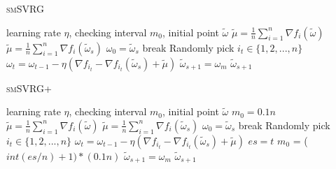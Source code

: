 \documentclass[conference]{IEEEtran}
\begin{document}
 
 \begin{algorithm}[t]
 	\caption{\textsc{smSVRG}}
	\label{smSVRG}
	\begin{algorithmic}[1]
	\Require learning rate $\eta$, checking interval $m_0$, initial point $\tilde{\omega}$
	\State $\tilde{\mu} = \frac{1}{n}\sum\limits_{i=1}^{n}\nabla f_{i}(\tilde{\omega})$
		\State $\tilde{\mu} = \frac{1}{n}\sum\limits_{i=1}^{n}\nabla f_{i}(\tilde{\omega}_{s})$
		\State $\omega_0 = \tilde{\omega}_s$
			\State break
			\EndIf
			\State Randomly pick $i_t\in\{1, 2, ..., n\}$
			\State $\omega_t = \omega_{t-1} - \eta(\nabla f_{i_t} - \nabla f_{i_t}(\tilde{\omega}_s)+\tilde{\mu})$
		\EndFor		
		\State $\tilde{\omega}_{s+1} = \omega_{m}$
	\EndFor
	\State \Return $\tilde{\omega}_{s+1}$
	\end{algorithmic}
\end{algorithm}

 \begin{algorithm}
 	\caption{\textsc{smSVRG+}}
	\label{smSVRG+}
	\begin{algorithmic}[1]
	\Require learning rate $\eta$, checking interval $m_0$, initial point $\tilde{\omega}$
	\Initial $m_0=0.1n$
	\State $\tilde{\mu} = \frac{1}{n}\sum\limits_{i=1}^{n}\nabla f_{i}(\tilde{\omega})$
		\State $\tilde{\mu} = \frac{1}{n}\sum\limits_{i=1}^{n}\nabla f_{i}(\tilde{\omega}_{s})$
		\State $\omega_0 = \tilde{\omega}_s$
			\State break
			\EndIf
			\State Randomly pick $i_t\in\{1, 2, ..., n\}$
			\State $\omega_t = \omega_{t-1} - \eta(\nabla f_{i_t} - \nabla f_{i_t}(\tilde{\omega}_s)+\tilde{\mu})$
		\EndFor
		\State $es = t$	
		\State $m_0$ = ($int(es/n)+1) * (0.1n)$
		\State $\tilde{\omega}_{s+1} = \omega_{m}$
	\EndFor
	\State \Return $\tilde{\omega}_{s+1}$
	\end{algorithmic}
\end{algorithm}
 
\end{document}
